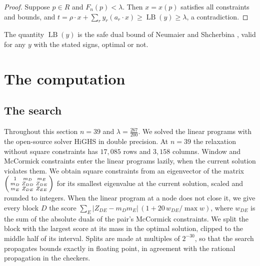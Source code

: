 \documentclass[11pt]{amsart}
\theoremstyle{definition}
\theoremstyle{remark}
\numberwithin{equation}{section}
\newcommand{\LB}{\operatorname{LB}}
\newcommand{\LAM}{\tfrac{267}{200}}
\newcommand{\Nbins}{39}
\newcommand{\LProws}{17{,}085}
\newcommand{\LPcols}{3{,}158}
\begin{document}
\begin{proof}
Suppose $p\in R$ and $F_n(p)<\lambda$. Then $x=x(p)$ satisfies all constraints and bounds, and $t=\rho\cdot x+\sum_ry_r(a_r\cdot x)\ge\LB(y)\ge\lambda$, a contradiction.
\end{proof}

The quantity $\LB(y)$ is the safe dual bound of Neumaier and Shcherbina \cite{NS04}, valid for any $y$ with the stated signs, optimal or not.

\section{The computation}\label{sec:computation}

\subsection{The search} Throughout this section $n=\Nbins$ and $\lambda=\LAM$. We solved the linear programs with the open-source solver HiGHS \cite{HiGHS} in double precision. At $n=\Nbins$ the relaxation without square constraints has $\LProws$ rows and $\LPcols$ columns. Window and McCormick constraints enter the linear programs lazily, when the current solution violates them. We obtain square constraints from an eigenvector of the matrix $\begin{psmallmatrix}1&m_D&m_E\\m_D&Z_{DD}&Z_{DE}\\m_E&Z_{DE}&Z_{EE}\end{psmallmatrix}$ for its smallest eigenvalue at the current solution, scaled and rounded to integers. When the linear program at a node does not close it, we give every block $D$ the score $\sum_E|Z_{DE}-m_Dm_E|\,(1+20\,w_{DE}/\max w)$, where $w_{DE}$ is the sum of the absolute duals of the pair's McCormick constraints. We split the block with the largest score at its mass in the optimal solution, clipped to the middle half of its interval. Splits are made at multiples of $2^{-30}$, so that the search propagates bounds exactly in floating point, in agreement with the rational propagation in the checkers.
\end{document}
